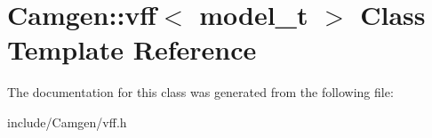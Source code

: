 \hypertarget{a00587}{}\section{Camgen\+:\+:vff$<$ model\+\_\+t $>$ Class Template Reference}
\label{a00587}


The documentation for this class was generated from the following file\+:\begin{DoxyCompactItemize}
\item 
include/\+Camgen/vff.\+h\end{DoxyCompactItemize}
